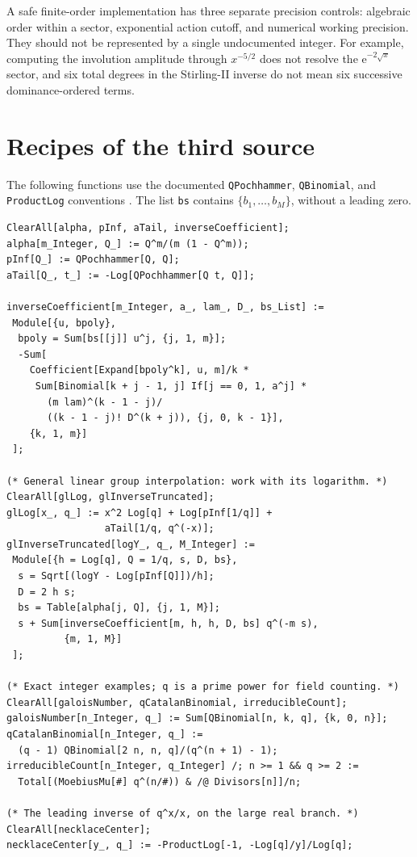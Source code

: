 \documentclass[11pt,openany]{book}
\numberwithin{equation}{chapter}
\theoremstyle{plain}
\theoremstyle{definition}
\theoremstyle{remark}
\newcommand{\ee}{\mathrm e}
\begin{document}
A safe finite-order implementation has three separate precision controls: algebraic order within a sector, exponential action cutoff, and numerical working precision. They should not be represented by a single undocumented integer. For example, computing the involution amplitude through $x^{-5/2}$ does not resolve the $\ee^{-2\sqrt x}$ sector, and six total degrees in the Stirling-II inverse do not mean six successive dominance-ordered terms.

\section{Recipes of the third source}
\label{ct:app:wolfram-t3}

\label{t3:app:wolfram}

The following functions use the documented \texttt{QPochhammer},
\texttt{QBinomial}, and \texttt{ProductLog} conventions
\cite{wlqpochhammer,wlqbinomial,wlproductlog}. The list \texttt{bs} contains
$\{b_1,\ldots,b_M\}$, without a leading zero.

\begin{lstlisting}
ClearAll[alpha, pInf, aTail, inverseCoefficient];
alpha[m_Integer, Q_] := Q^m/(m (1 - Q^m));
pInf[Q_] := QPochhammer[Q, Q];
aTail[Q_, t_] := -Log[QPochhammer[Q t, Q]];

inverseCoefficient[m_Integer, a_, lam_, D_, bs_List] :=
 Module[{u, bpoly},
  bpoly = Sum[bs[[j]] u^j, {j, 1, m}];
  -Sum[
    Coefficient[Expand[bpoly^k], u, m]/k *
     Sum[Binomial[k + j - 1, j] If[j == 0, 1, a^j] *
       (m lam)^(k - 1 - j)/
       ((k - 1 - j)! D^(k + j)), {j, 0, k - 1}],
    {k, 1, m}]
 ];

(* General linear group interpolation: work with its logarithm. *)
ClearAll[glLog, glInverseTruncated];
glLog[x_, q_] := x^2 Log[q] + Log[pInf[1/q]] +
                 aTail[1/q, q^(-x)];
glInverseTruncated[logY_, q_, M_Integer] :=
 Module[{h = Log[q], Q = 1/q, s, D, bs},
  s = Sqrt[(logY - Log[pInf[Q]])/h];
  D = 2 h s;
  bs = Table[alpha[j, Q], {j, 1, M}];
  s + Sum[inverseCoefficient[m, h, h, D, bs] q^(-m s),
          {m, 1, M}]
 ];

(* Exact integer examples; q is a prime power for field counting. *)
ClearAll[galoisNumber, qCatalanBinomial, irreducibleCount];
galoisNumber[n_Integer, q_] := Sum[QBinomial[n, k, q], {k, 0, n}];
qCatalanBinomial[n_Integer, q_] :=
  (q - 1) QBinomial[2 n, n, q]/(q^(n + 1) - 1);
irreducibleCount[n_Integer, q_Integer] /; n >= 1 && q >= 2 :=
  Total[(MoebiusMu[#] q^(n/#)) & /@ Divisors[n]]/n;

(* The leading inverse of q^x/x, on the large real branch. *)
ClearAll[necklaceCenter];
necklaceCenter[y_, q_] := -ProductLog[-1, -Log[q]/y]/Log[q];
\end{lstlisting}
\end{document}

